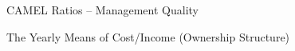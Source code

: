 \documentclass[
  12pt,
  a4paper,
]{scrreprt}
\begin{document}
{{{{\begin{figure}
{}

\caption{\label{fig-CAMELMQ}CAMEL Ratios -- Management Quality}

\end{figure}%

\begin{figure}


\caption{\label{fig-Cost}The Yearly Means of Cost/Income (Ownership
Structure)}

\end{figure}%

}}}}
\end{document}
